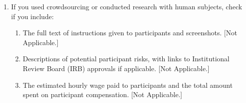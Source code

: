 \begin{enumerate}
  \item If you used crowdsourcing or conducted research with human subjects, check if
  you include:
  \begin{enumerate}
    \item The full text of instructions given to participants and screenshots. [Not
    Applicable.]
    \item Descriptions of potential participant risks, with links to Institutional
    Review Board (IRB) approvals if applicable. [Not Applicable.]
    \item The estimated hourly wage paid to participants and the total amount spent on
    participant compensation. [Not Applicable.]
  \end{enumerate}

\end{enumerate}
